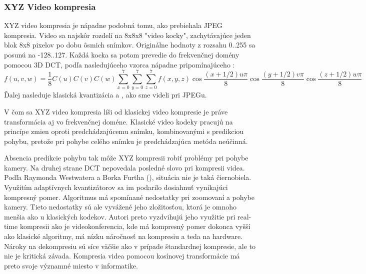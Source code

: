 \subsubsection{XYZ Video kompresia}
XYZ video kompresia je nápadne podobná tomu, ako prebiehala JPEG
kompresia. Video sa najskôr rozdelí na 8x8x8 "video kocky",
zachytávajúce jeden blok 8x8 pixelov po dobu ôsmich snímkov.
Originálne hodnoty z rozsahu 0..255 sa posunú na -128..127.
Každá kocka sa potom prevedie do frekvenčnej domény pomocou 3D DCT,
podľa nasledujúceho vzorca nápadne pripomínajúceho \todo{}:
\begin{equation}
   f(u,v,w) = \frac{1}{8} C(u) C(v) C(w)
    \sum_{x=0}^7 \sum_{y=0}^7 \sum_{z=0}^7 f(x,y,z)
        \cos\frac{(x+1/2) u \pi}{8}
        \cos\frac{(y+1/2) v \pi}{8}
        \cos\frac{(z+1/2) w \pi}{8}
\end{equation}
Ďalej nasleduje klasická kvantizácia a , ako sme
videli pri JPEGu.

V čom sa XYZ video kompresia líši od klasickej video kompresie je
práve transformácia aj vo frekvenčnej doméne. Klasické video kodeky
pracujú na princípe zmien oproti predchádzajúcemu snímku,
kombinovanými s predikciou pohybu, pretože pri pohybe celého
snímku je predchádzajúca metóda neúčinná.

Absencia predikcie pohybu tak môže XYZ kompresii robiť problémy pri
pohybe kamery. Na druhej strane DCT nepovedala posledné slovo pri
kompresii videa. Podľa Raymonda Westwatera a Borka Furtha 
(\cite{3ddct_adaptive}), situácia nie je taká
čiernobiela. Využitím adaptívnych kvantizátorov sa im podarilo
dosiahnuť vynikajúci kompresný pomer. Algoritmus má spomínané
nedostatky pri zoomovaní a pohybe kamery. Tieto nedostatky sú ale
vyvážené jeho zložitosťou, ktorá je omnoho menšia ako u klasických
kodekov. Autori preto vyzdvihujú jeho využitie pri real-time kompresii
ako je videokonferencia, kde má kompresný pomer dokonca vyšší ako
klasické algoritmy, má nízku náročnosť na kompresiu a teda na
hardware. Nároky na dekompresiu sú síce väčšie ako v prípade
štandardnej kompresie, ale to nie je kritická závada. Kompresia videa
pomocou kosínovej transformácie má preto svoje významné miesto v
informatike.

